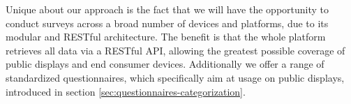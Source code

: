 	Unique about our approach is the fact that we will have the opportunity to conduct surveys across a broad number of devices and platforms, due to its modular and RESTful architecture. The benefit is that the whole platform retrieves all data via a RESTful API, allowing the greatest possible coverage of public displays and end consumer devices. Additionally we offer a range of standardized questionnaires, which specifically aim at usage on public displays, introduced in section \ref{sec:questionnaires-categorization}.








